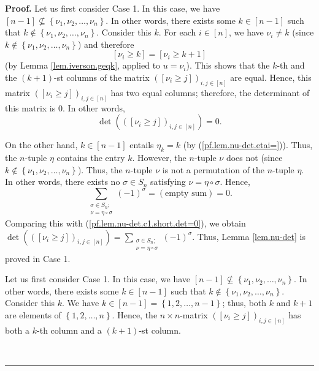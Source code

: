 \documentclass
[numbers=enddot,12pt,final,onecolumn,notitlepage,english]{scrartcl}%
\theoremstyle{definition}
\newenvironment{proof}[1][Proof]{\noindent\textbf{#1.} }{\ \rule{0.5em}{0.5em}}
\let\sumnonlimits\sum
\renewcommand{\sum}{\sumnonlimits\limits}
\newenvironment{verlong}{}{}
\newenvironment{vershort}{}{}
\begin{document}
\begin{proof}
\begin{vershort}
Let us first consider Case 1. In this case, we have $\left[  n-1\right]
\not \subseteq \left\{  \nu_{1},\nu_{2},\ldots,\nu_{n}\right\}  $. In other
words, there exists some $k\in\left[  n-1\right]  $ such that $k\notin\left\{
\nu_{1},\nu_{2},\ldots,\nu_{n}\right\}  $. Consider this $k$. For each
$i\in\left[  n\right]  $, we have $\nu_{i}\neq k$ (since $k\notin\left\{
\nu_{1},\nu_{2},\ldots,\nu_{n}\right\}  $) and therefore%
\[
\left[  \nu_{i}\geq k\right]  =\left[  \nu_{i}\geq k+1\right]
\]
(by Lemma \ref{lem.iverson.geqk}, applied to $u=\nu_{i}$). This shows that the
$k$-th and the $\left(  k+1\right)  $-st columns of the matrix $\left(
\left[  \nu_{i}\geq j\right]  \right)  _{i,j\in\left[  n\right]  }$ are equal.
Hence, this matrix $\left(  \left[  \nu_{i}\geq j\right]  \right)
_{i,j\in\left[  n\right]  }$ has two equal columns; therefore, the determinant
of this matrix is $0$. In other words,
\begin{equation}
\det\left(  \left(  \left[  \nu_{i}\geq j\right]  \right)  _{i,j\in\left[
n\right]  }\right)  =0. \label{pf.lem.nu-det.c1.short.det=0}%
\end{equation}


On the other hand, $k\in\left[  n-1\right]  $ entails $\eta_{k}=k$ (by
(\ref{pf.lem.nu-det.etai=})). Thus, the $n$-tuple $\eta$ contains the entry
$k$. However, the $n$-tuple $\nu$ does not (since $k\notin\left\{  \nu_{1}%
,\nu_{2},\ldots,\nu_{n}\right\}  $). Thus, the $n$-tuple $\nu$ is not a
permutation of the $n$-tuple $\eta$. In other words, there exists no
$\sigma\in S_{n}$ satisfying $\nu=\eta\circ\sigma$. Hence,%
\[
\sum_{\substack{\sigma\in S_{n};\\\nu=\eta\circ\sigma}}\left(  -1\right)
^{\sigma}=\left(  \text{empty sum}\right)  =0.
\]
Comparing this with (\ref{pf.lem.nu-det.c1.short.det=0}), we obtain
$\det\left(  \left(  \left[  \nu_{i}\geq j\right]  \right)  _{i,j\in\left[
n\right]  }\right)  =\sum_{\substack{\sigma\in S_{n};\\\nu=\eta\circ\sigma
}}\left(  -1\right)  ^{\sigma}$. Thus, Lemma \ref{lem.nu-det} is proved in
Case 1. \medskip
\end{vershort}

\begin{verlong}
Let us first consider Case 1. In this case, we have $\left[  n-1\right]
\not \subseteq \left\{  \nu_{1},\nu_{2},\ldots,\nu_{n}\right\}  $. In other
words, there exists some $k\in\left[  n-1\right]  $ such that $k\notin\left\{
\nu_{1},\nu_{2},\ldots,\nu_{n}\right\}  $. Consider this $k$. We have
$k\in\left[  n-1\right]  =\left\{  1,2,\ldots,n-1\right\}  $; thus, both $k$
and $k+1$ are elements of $\left\{  1,2,\ldots,n\right\}  $. Hence, the
$n\times n$-matrix $\left(  \left[  \nu_{i}\geq j\right]  \right)
_{i,j\in\left[  n\right]  }$ has both a $k$-th column and a $\left(
k+1\right)  $-st column.


\end{verlong}
\end{proof}
\end{document}

